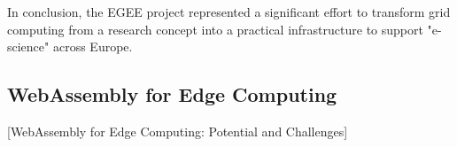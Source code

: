 In conclusion, the \ac{EGEE} project represented a significant effort to transform grid computing from a research concept into a practical infrastructure to support "e-science" across Europe.

\subsection{WebAssembly for Edge Computing}
\label{subsec:background:related_work:wasmedgecomputing}
[WebAssembly for Edge Computing: Potential and Challenges] \cite{relatedwork:wasmedgecomputing}